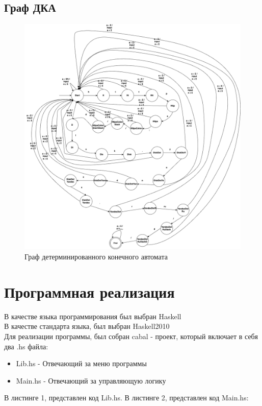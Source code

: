 \documentclass[areasetadvanced]{scrartcl}
\begin{document}
\subsection{Граф ДКА}
\begin{figure}[H]
  \centering
  \includegraphics[width=1.0\textwidth]{DFA.png}
  \caption{Граф детерминированного конечного автомата}
  \label{fig:DFA}
\end{figure}
\newpage 
\section{Программная реализация}
В качестве языка программирования был выбран Haskell \\
В качестве стандарта языка, был выбран Haskell2010 \\
Для реализации программы, был собран cabal - проект, который включает в себя два .hs файла:
\begin{itemize}
	\item Lib.hs - Отвечающий за меню программы
	\item Main.hs - Отвечающий за управляющую логику
\end{itemize}
В листинге 1, представлен код Lib.hs. В листинге 2, представлен код Main.hs:
\end{document}
